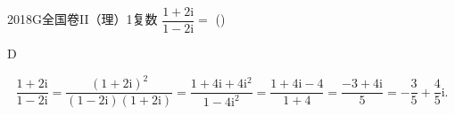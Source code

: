 
\begin{problem}{2018}{G}{全国卷II（理）}{1}{复数}
$ \dfrac{1+2\mathrm{i}}{1-2\mathrm{i}} = $ (\hspace{1cm})
\begin{choices}
\end{choices}
\end{problem}

\begin{answer}
D
\end{answer}

\begin{solutions}
$$
\dfrac{1+2\mathrm{i}}{1-2\mathrm{i}} = \dfrac{(1+2\mathrm{i})^2}{(1-2\mathrm{i})(1+2\mathrm{i})} = \dfrac{1+4\mathrm{i}+4\mathrm{i}^2}{1-4\mathrm{i}^2} = \dfrac{1+4\mathrm{i}-4}{1+4} = \dfrac{-3+4\mathrm{i}}{5} = -\dfrac{3}{5}+\dfrac{4}{5}\mathrm{i}.
$$
\end{solutions}
